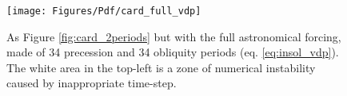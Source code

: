 \begin{figure}
\texttt{[image: Figures/Pdf/card\_full\_vdp]}
\caption
{
As Figure \ref{fig:card_2periods} but with the full astronomical forcing,
made of 34 precession and 34 obliquity periods (eq. \eqref{eq:insol_vdp}).
The white area in the top-left is a zone of numerical instability caused by inappropriate
time-step.
}
\label{fig:card_full_vdp}
\end{figure}
